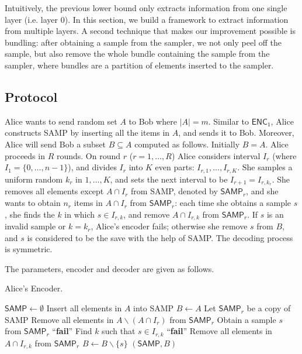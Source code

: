 \documentclass[10pt]{article}
\newcommand{\samp}{\textsf{SAMP}\xspace}
\newcommand{\enc}{\textsf{ENC}\xspace}
\begin{document}
Intuitively, the previous lower bound only extracts information from one single layer (i.e. layer $0$). In this section, we build a framework to extract information from multiple layers. A second technique that makes our improvement possible is bundling: after obtaining a sample from the sampler, we not only peel off the sample, but also remove the whole bundle containing the sample from the sampler, where bundles are a partition of elements inserted to the sampler.

\subsection{Protocol}

Alice wants to send random set $A$ to Bob where $|A|=m$. Similar to $\enc_1$, Alice constructs \samp by inserting all the items in $A$, and sends it to Bob. Moreover, Alice will send Bob a subset $B\subseteq A$ computed as follows. Initially $B=A$. Alice proceeds in $R$ rounds. On round $r$ ($r=1,\ldots, R$) Alice considers interval $I_r$ (where $I_1=\{0,\ldots, n-1\}$), and divides $I_r$ into $K$ even parts: $I_{r,1}, \ldots, I_{r,K}$. She samples a uniform random $k_r$ in $1,\ldots, K$, and sets the next interval to be $I_{r+1}=I_{r,k_r}$. She removes all elements except $A\cap I_r$ from \samp, denoted by $\samp_r$, and she wants to obtain $n_r$ items in $A\cap I_r$ from $\samp_r$: each time she obtains a sample $s$, she finds the $k$ in which $s \in I_{r,k}$, and remove $A\cap I_{r,k}$ from $\samp_r$. If $s$ is an invalid sample or $k=k_r$, Alice's encoder fails; otherwise she remove $s$ from $B$, and $s$ is considered to be the save with the help of \samp.  The decoding process is symmetric. 

The parameters, encoder and decoder are given as follows. 


\begin{algorithm}[H]
  \caption{Alice's Encoder.}
  \begin{algorithmic}[1]
    \Procedure{$\enc_4$}{$A$}
    \State $\samp \leftarrow \emptyset$
    \State Insert all elements in $A$ into \samp
    \State $B\leftarrow A$
      \State Let $\samp_r$ be a copy of \samp
      \State Remove all elements in $A\backslash (A\cap I_r)$ from $\samp_r$
        \State Obtain a sample $s$ from $\samp_r$ 
          \State \Return ``\textbf{fail}'' \label{algo-enc_4:sampler-wrong}
        \EndIf
        \State Find $k$ such that $s\in I_{r,k}$ 
          \State \Return ``\textbf{fail}'' \label{algo-enc_4:kill-wrong}
        \EndIf
        \State Remove all elements in $A\cap I_{r,k}$ from $\samp_r$
        \State $B \leftarrow B \backslash \{s\}$
      \EndFor
    \EndFor
    \State \Return $(\samp, B)$ 
    \EndProcedure
  \end{algorithmic}
\end{algorithm}
\end{document}
